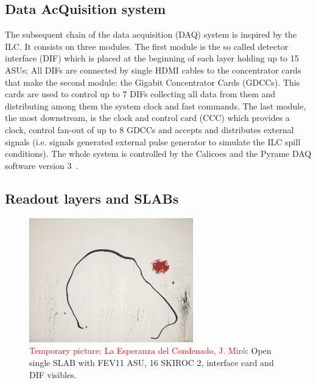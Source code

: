 \documentclass[final,3p,times,twocolumn]{elsarticle}
\newcommand{\todo}[1]{\textcolor{red}{{#1}}}
\begin{document}
\subsection{Data AcQuisition system}
\label{sec:DAQ}

The subsequent chain of the data acquisition (DAQ)\cite{Gastaldi:2014vaa} system is inspired by the ILC.
It consists on three modules.
The first module is the so called detector interface (DIF) which is placed at the beginning of each layer holding up to 15 ASUs;
All DIFs are connected by single HDMI cables to the concentrator cards that make
the second module: the Gigabit Concentrator Cards (GDCCs).
This cards are used to control up to 7 DIFs collecting all data from them and distributing among them the system clock and fast commands.
The last module, the most downstream, is the clock and control card (CCC) which
provides a clock, control fan-out of up to 8 GDCCs and accepts and distributes external signals (i.e. signals
generated external pulse generator to simulate the ILC spill conditions).
The whole system is controlled by the Calicoes and the Pyrame DAQ software version 3~\cite{Rubio-Roy:2017ere,Magniette:2018wdz}.

\subsection{Readout layers and SLABs}
\label{sec:setup}

\begin{figure}[!t]
  \centering
    \includegraphics[width=2.8in]{../figs/test.jpg} 
  \caption{\todo{Temporary picture: La Esperanza del Condenado, J. Miró}: Open single SLAB with FEV11 ASU, 16 SKIROC 2, interface card and DIF visibles. }
\label{ASU2}
\end{figure}
\end{document}
